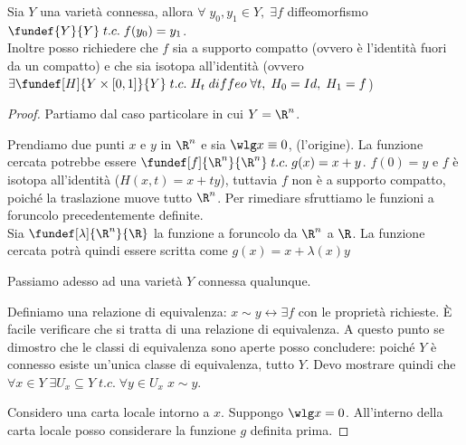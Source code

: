 
\begin{teo}
	Sia $Y$ una varietà connessa, allora $\forall \; y_0, y_1 \in Y, \; \exists f$ diffeomorfismo $\fundef{Y}{Y} \; t.c. \; f(y_0)=y_1$.
	\\ Inoltre posso richiedere che $f$ sia a supporto compatto (ovvero è l'identità fuori da un compatto) e che sia isotopa all'identità (ovvero $\exists \fundef[H]{Y\times [0,1]}{Y} \; t.c. \; H_t \; diffeo \; \forall t, \; H_0=Id, \; H_1=f$)
\end{teo}

\begin{proof}
	Partiamo dal caso particolare in cui $Y=\R^n$.
	
	Prendiamo due punti $x$ e $y$ in $\R^n$ e sia $\wlg x\equiv 0$, (l'origine).
	La funzione cercata potrebbe essere $\fundef[f]{\R^n}{\R^n} \; t.c. \; g(x)=x+y$.
	$f(0)=y$ e $f$ è isotopa all'identità ($H(x,t)=x+ty$), tuttavia $f$ non è a supporto compatto, poiché la traslazione muove tutto $\R^n$. Per rimediare sfruttiamo le funzioni a foruncolo precedentemente definite.
	\\ Sia $\fundef[\lambda]{\R^n}{\R}$ la funzione a foruncolo da $\R^n$ a $\R$. La funzione cercata potrà quindi essere scritta come $g(x)=x+\lambda(x)y$

	Passiamo adesso ad una varietà $Y$ connessa qualunque.

	Definiamo una relazione di equivalenza: $x \sim y \leftrightarrow \exists f$ con le proprietà richieste.
	È facile verificare che si tratta di una relazione di equivalenza. A questo punto se dimostro che le classi di equivalenza sono aperte posso concludere: poiché $Y$ è connesso esiste un'unica classe di equivalenza, tutto $Y$.
	Devo mostrare quindi che $\forall x \in Y \; \exists U_x \subseteq Y \; t.c. \; \forall y \in U_x \; x \sim y$.
	
	Considero una carta locale intorno a $x$. Suppongo $\wlg x =0$. All'interno della carta locale posso considerare la funzione $g$ definita prima.
\end{proof}


